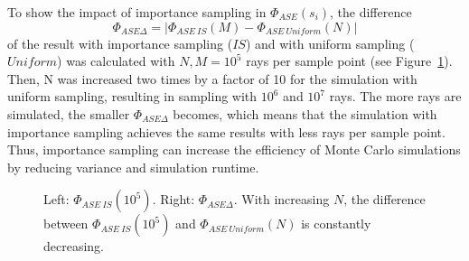 To show the impact of importance sampling in $\Phi_{ASE}(s_i)$, the difference
\[\Phi_{ASE\Delta} = |\Phi_{ASE~IS}(M) - \Phi_{ASE~Uniform}(N)|\] of the 
result with importance sampling ($IS$) and with uniform sampling ($Uniform$) was calculated with 
$N,M = 10^5$ rays per sample point (see Figure~\ref{graphic:importance}). 
Then, N was increased two times by a factor of 10 for the simulation with uniform sampling, resulting in sampling with $10^6$ and $10^7$ rays.
The more rays are simulated, the smaller $\Phi_{ASE\Delta}$ becomes, which 
means that the simulation
with importance sampling achieves the same results with less
rays per sample point. Thus, importance sampling can increase the
efficiency of Monte Carlo simulations by reducing variance 
and simulation runtime. 
\begin{figure}[H]
  \centerline
  {}
  \caption{Left: $\Phi_{ASE~IS}(10^5)$. Right:
    $\Phi_{ASE\Delta}$. With increasing $N$, the difference between
    $\Phi_{ASE~IS}(10^5)$ and $\Phi_{ASE~Uniform}(N)$ is constantly
    decreasing.}
  \label{graphic:importance}
\end{figure}
